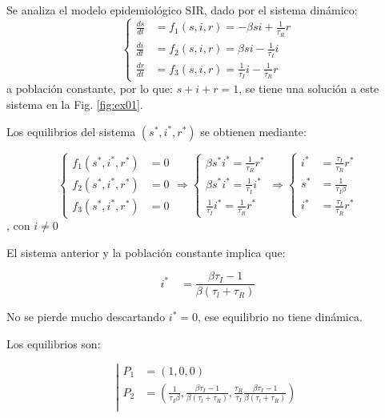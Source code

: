 \documentclass[twocolumn,aps,prl]{revtex4-1}
\begin{document}
Se analiza el modelo epidemiológico SIR, dado por el sistema dinámico:
$$
\left\lbrace
\begin{aligned}
\frac{d s}{d t} & = f_1(s,i,r) = -\beta s i+\frac{1}{\tau_{R}} r \\
\frac{d i}{d t} & = f_2(s,i,r) =\beta s i-\frac{1}{\tau_{I}} i \\
\frac{d r}{d t} & = f_3(s,i,r) =\frac{1}{\tau_{I}} i-\frac{1}{\tau_{R}} r
\end{aligned}
\right.
$$
a población constante, por lo que: $s+i+r =1 $, se tiene una solución a este sistema en la Fig. \ref{fig:ex01}.

Los equilibrios del sistema $\left(s^{*}, i^{*}, r^{*}\right)$ se obtienen mediante:

$$
\left\lbrace
\begin{aligned}
f_1(s^*, i^*, r^*) &= 0  \\
f_2(s^*, i^*, r^*) &= 0  \\
f_3(s^*, i^*, r^*) &= 0
\end{aligned}
\right.
\Rightarrow
\left\lbrace
\begin{aligned}
\beta s^* i^* = \frac{1}{\tau_{R}} r^* \\
\beta s^* i^* = \frac{1}{\tau_{I}} i^* \\
\frac{1}{\tau_{I}} i^* = \frac{1}{\tau_{R}} r^*
\end{aligned}
\right.
\Rightarrow
\left\lbrace
\begin{aligned}
i^* &= \frac{\tau_{I}}{\tau_{R}} r^* \\
s^* &= \frac{1}{\tau_{I} \beta}      \\
i^* &= \frac{\tau_{I}}{\tau_{R}} r^* 
\end{aligned}
\right.
$$, con $i \neq 0$

El sistema anterior y la población constante implica que:

$$
i^{*} \quad=\frac{\beta \tau_{I}-1}{\beta\left(\tau_{l}+\tau_{R}\right)}
$$

No se pierde mucho descartando $i^{*}=0$, ese equilibrio no tiene dinámica.

Los equilibrios son:

$$
\left\lvert 
\begin{aligned}
    P_1 &= (1, 0, 0) \\ 
    P_2 &= 
    ( \frac{1}{\tau_{I} \beta}  
    , \frac{\beta \tau_{I}-1}{\beta\left(\tau_{l}+\tau_{R}\right)}
    , \frac{\tau_{R}}{\tau_{I}} \frac{\beta \tau_{I}-1}{\beta\left(\tau_{l}+\tau_{R}\right)}
    ) \\ 
\end{aligned} \right.
$$
\end{document}
